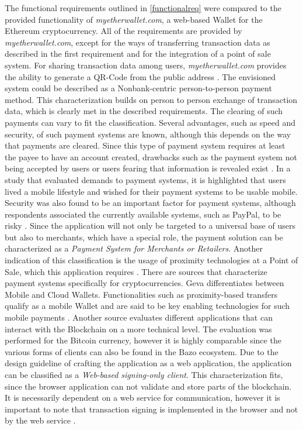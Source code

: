 The functional requirements outlined in \ref{functionalreq} were compared to %
the provided functionality of \textit{myetherwallet.com}, a web-based Wallet for the Ethereum cryptocurrency. All of the requirements are provided by \textit{myetherwallet.com}, except for the ways of transferring transaction data as described in the first requirement and for the integration of a point of sale system. For sharing transaction data among users, \textit{myetherwallet.com} provides the ability to generate a QR-Code from the public address \cite{myethwallet}. %
The envisioned system could be described as a Nonbank-centric person-to-person payment method. This characterization builds on person to person exchange of transaction data, which is clearly met in the described requirements. The clearing of such payments can vary to fit the classification. %
Several advantages, such as speed and security, of such payment systems are known, although this depends on the way that payments are cleared. Since this type of payment system requires at least the payee to have an account created, drawbacks such as the payment system not being accepted by users or users fearing that information is revealed exist \cite{p2ppayments}. 
In a study that evaluated demands to payment systems, it is highlighted that users lived a mobile lifestyle and wished for their payment systems to be usable mobile. Security was also found to be an important factor for payment systems, although respondents associated the currently available systems, such as PayPal, to be risky \cite{p2ppadoption}.
Since the application will not only be targeted to a universal base of users but also to merchants, which have a special role, the payment solution can be characterized as a  \textit{Payment System for Merchants or Retailers}.
Another indication of this classification is the usage of proximity technologies at a Point of Sale, which this application requires \cite{p2ptypes}.
There are sources that characterize payment systems specifically for cryptocurrencies. Geva differentiates between Mobile and Cloud Wallets. Functionalities such as proximity-based transfers qualify as a mobile Wallet and are said to be key enabling technologies for such mobile payments \cite{bitcoinmobile}.
Another source evaluates different applications that can interact with the Blockchain on a more technical level. The evaluation was performed for the Bitcoin currency, however it is highly comparable since the various forms of clients can also be found in the Bazo ecosystem.
Due to the design guideline of crafting the application as a web application, the application can be classified as a \textit{ Web-based signing-only client}. This characterization fits, since the browser application can not validate and store parts of the blockchain. It is necessarily dependent on a web service for communication, however it is important to note that transaction signing is implemented in the browser and not by the web service \cite{bitcoinclients}. 

